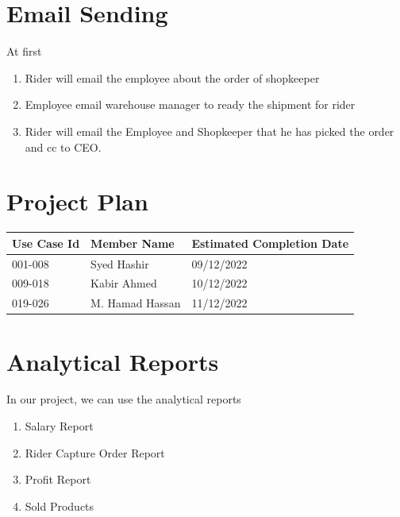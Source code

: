 \documentclass[12pt,a4paper]{report}
\begin{document}
\newpage
\chapter {Email Sending}
At first
\begin{enumerate}
\item Rider will email the employee about the order of shopkeeper
\item Employee email warehouse manager to ready the shipment for rider
\item Rider will email the Employee and Shopkeeper that he has picked the order and cc to CEO.
\end{enumerate}

\newpage
\chapter {Project Plan}
\begin{tabular}{ | m{2cm} | m{4cm}|| m{3cm}|} \hline
\textbf{ Use Case Id }&\textbf{ Member Name}&\textbf{Estimated Completion Date} \\ \hline
001-008& Syed Hashir 	&09/12/2022   \\ \hline
009-018& Kabir Ahmed	&10/12/2022   \\ \hline
019-026& M. Hamad Hassan&11/12/2022  \\ \hline
\end{tabular}


\newpage
\chapter {Analytical Reports}
In our project, we can use the analytical reports
\begin{enumerate}
\item Salary Report  
\item Rider Capture Order Report 
\item Profit Report 
\item Sold Products


\end{enumerate}
\end{document}

